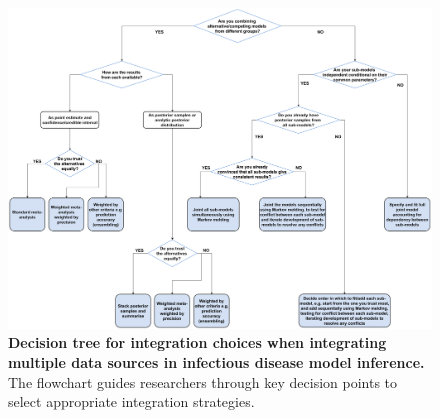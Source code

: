 \documentclass{article}
\begin{document}


\begin{figure}[htbp]
    \centering
    \includegraphics[width=\textwidth]{figures/integration choices decision tree.drawio.pdf}
    \caption{\textbf{Decision tree for integration choices when integrating multiple data sources in infectious disease model inference.} The flowchart guides researchers through key decision points to select appropriate integration strategies.}
    \label{fig:integration}
\end{figure}
\end{document}
